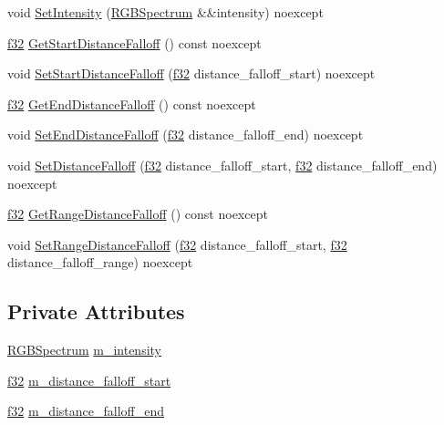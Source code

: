 \begin{DoxyCompactItemize}
void \hyperlink{structmage_1_1_scene_fog_aa953b6e08e2f6bcecfbb906959e876ea}{Set\+Intensity} (\hyperlink{structmage_1_1_r_g_b_spectrum}{R\+G\+B\+Spectrum} \&\&intensity) noexcept
\item 
\hyperlink{namespacemage_a6a44ad388483959dc4dff9f2aef91431}{f32} \hyperlink{structmage_1_1_scene_fog_af7679e95c8959d9b502c4256ab7699ba}{Get\+Start\+Distance\+Falloff} () const noexcept
\item 
void \hyperlink{structmage_1_1_scene_fog_a89837d3ad96d75de0b5a7d201fff85ee}{Set\+Start\+Distance\+Falloff} (\hyperlink{namespacemage_a6a44ad388483959dc4dff9f2aef91431}{f32} distance\+\_\+falloff\+\_\+start) noexcept
\item 
\hyperlink{namespacemage_a6a44ad388483959dc4dff9f2aef91431}{f32} \hyperlink{structmage_1_1_scene_fog_adf04c85deb6254e43753d2926fba4189}{Get\+End\+Distance\+Falloff} () const noexcept
\item 
void \hyperlink{structmage_1_1_scene_fog_a63934cf28c20b2a81b004e0ced1182fa}{Set\+End\+Distance\+Falloff} (\hyperlink{namespacemage_a6a44ad388483959dc4dff9f2aef91431}{f32} distance\+\_\+falloff\+\_\+end) noexcept
\item 
void \hyperlink{structmage_1_1_scene_fog_af512972b3ec6d52b28643f69acadd5da}{Set\+Distance\+Falloff} (\hyperlink{namespacemage_a6a44ad388483959dc4dff9f2aef91431}{f32} distance\+\_\+falloff\+\_\+start, \hyperlink{namespacemage_a6a44ad388483959dc4dff9f2aef91431}{f32} distance\+\_\+falloff\+\_\+end) noexcept
\item 
\hyperlink{namespacemage_a6a44ad388483959dc4dff9f2aef91431}{f32} \hyperlink{structmage_1_1_scene_fog_a9144cd66a763f3017b88a3b6f9658925}{Get\+Range\+Distance\+Falloff} () const noexcept
\item 
void \hyperlink{structmage_1_1_scene_fog_a628aa2334e5992fe952377ab61499d60}{Set\+Range\+Distance\+Falloff} (\hyperlink{namespacemage_a6a44ad388483959dc4dff9f2aef91431}{f32} distance\+\_\+falloff\+\_\+start, \hyperlink{namespacemage_a6a44ad388483959dc4dff9f2aef91431}{f32} distance\+\_\+falloff\+\_\+range) noexcept
\end{DoxyCompactItemize}
\subsection*{Private Attributes}
\begin{DoxyCompactItemize}
\item 
\hyperlink{structmage_1_1_r_g_b_spectrum}{R\+G\+B\+Spectrum} \hyperlink{structmage_1_1_scene_fog_ad3758984c5a1941cd883dd82f8ebe975}{m\+\_\+intensity}
\item 
\hyperlink{namespacemage_a6a44ad388483959dc4dff9f2aef91431}{f32} \hyperlink{structmage_1_1_scene_fog_a81cbca73f4f077ff11da8c8fd781623e}{m\+\_\+distance\+\_\+falloff\+\_\+start}
\item 
\hyperlink{namespacemage_a6a44ad388483959dc4dff9f2aef91431}{f32} \hyperlink{structmage_1_1_scene_fog_ab16014aa8c1e6f4a9e8edc168bc9b4ed}{m\+\_\+distance\+\_\+falloff\+\_\+end}
\end{DoxyCompactItemize}


